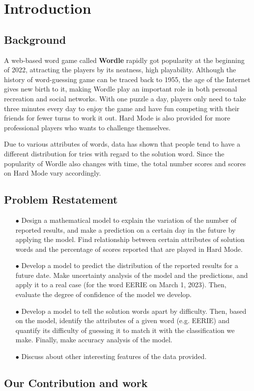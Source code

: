 \section{Introduction}
\subsection{Background}
A web-based word game called \textbf{Wordle} rapidly got  popularity at the beginning of 2022, attracting the players by its neatness, high playability. Although the history of word-guessing game can be traced back to 1955, the age of the Internet gives new birth to it, making Wordle play an important role in both personal recreation and social networks\cite{article1}. With one puzzle a day, players only need to take three minutes every day to enjoy the game and have fun competing with their friends for fewer turns to work it out. Hard Mode is also provided for more professional players who wants to challenge themselves. 
\par Due to various attributes of words, data has shown that people tend to have a different distribution for tries with regard to the solution word. Since the popularity of Wordle also changes with time, the total number scores and scores on Hard Mode vary accordingly.

\subsection{Problem Restatement}
\begin{itemize}
\item[$\bullet$] Design a mathematical model to explain the variation of the number of reported results, and make a prediction on a certain day in the future by applying the model. Find relationship between certain attributes of solution words and the percentage of scores reported that are played in Hard Mode.
\item[$\bullet$] Develop a model to predict the distribution of the reported results for a future date. Make uncertainty analysis of the model and the predictions, and apply it to a real case (for the word EERIE on March 1, 2023). Then, evaluate the degree of confidence of the model we develop.
\item [$\bullet$] Develop a model to tell the solution words apart by difficulty. Then, based on the model, identify the attributes of a given word (e.g. EERIE) and quantify its difficulty of guessing it to match it with the classification we make. Finally, make accuracy analysis of the model.   
\item [$\bullet$] Discuss about other interesting features of the data provided.
\end{itemize}
\subsection{Our Contribution and work}
